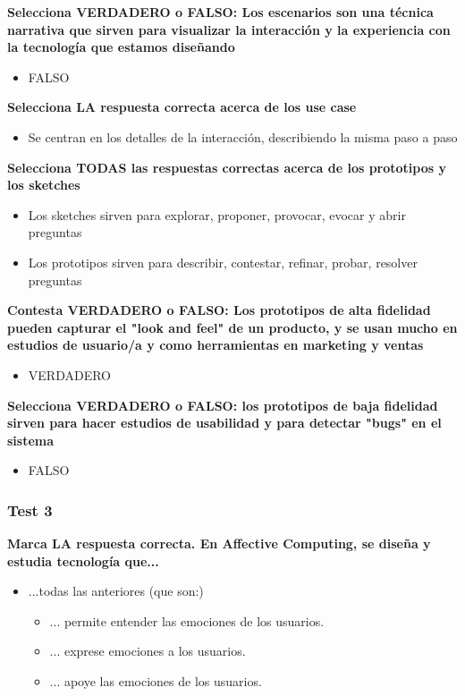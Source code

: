 \documentclass[12pt, twoside, openright]{report} %
\begin{document}
\textbf{Selecciona VERDADERO o FALSO: Los escenarios son una técnica narrativa que sirven para visualizar la interacción y la experiencia con la tecnología que estamos diseñando}
\begin{itemize}
  \item FALSO
\end{itemize}

\textbf{Selecciona LA respuesta correcta acerca de los use case}
\begin{itemize}
  \item Se centran en los detalles de la interacción, describiendo la misma paso a paso
\end{itemize}

\textbf{Selecciona TODAS las respuestas correctas acerca de los prototipos y los sketches}
\begin{itemize}
  \item Los sketches sirven para explorar, proponer, provocar, evocar y abrir preguntas
  \item Los prototipos sirven para describir, contestar, refinar, probar, resolver preguntas
\end{itemize}

\textbf{Contesta VERDADERO o FALSO: Los prototipos de alta fidelidad pueden capturar el "look and feel" de un producto, y se usan mucho en estudios de usuario/a y como herramientas en marketing y ventas}
\begin{itemize}
  \item VERDADERO
\end{itemize}

\textbf{Selecciona VERDADERO o FALSO: los prototipos de baja fidelidad sirven para hacer estudios de usabilidad y para detectar "bugs"  en el sistema}
\begin{itemize}
  \item FALSO
\end{itemize}
\pagebreak
\subsubsection{Test 3}

\textbf{Marca LA respuesta correcta. En Affective Computing, se diseña y estudia tecnología que...}
\begin{itemize}
  \item ...todas las anteriores (que son:)
  \begin{itemize}
    \item ... permite entender las emociones de los usuarios.
    \item ... exprese emociones a los usuarios.
    \item ... apoye las emociones de los usuarios.
  \end{itemize}
\end{itemize}
\end{document}

